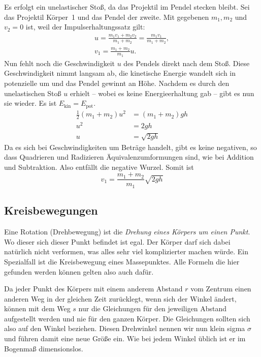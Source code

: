 \documentclass[a4paper,10pt,fleqn,twocolumn,twoside]{article}
\begin{document}
Es erfolgt ein unelastischer Stoß, da das Projektil im Pendel stecken
bleibt. Sei das Projektil Körper~1 und das Pendel der zweite.
Mit gegebenen \(m_1, m_2\) und \(v_2=0\) ist, weil der
Impulserhaltungssatz gilt:
\begin{gather*}
u = \frac{m_1 v_1 + m_2 v_2}{m_1 + m_2} = \frac{m_1 v_1}{m_1 + m_2},\\
v_1 = \frac{m_1 + m_2}{m_1} u.
\end{gather*}
%
Nun fehlt noch die Geschwindigkeit \(u\) des Pendels direkt nach
dem Stoß. Diese Geschwindigkeit nimmt langsam ab, die kinetische
Energie wandelt sich in potenzielle um und das Pendel gewinnt an
Höhe. Nachdem es durch den unelastischen Stoß \(u\) erhielt -- wobei
es keine Energieerhaltung gab -- gibt es nun sie wieder.
Es ist \(E_\text{kin} = E_\text{pot}\).
\begin{align*}
\frac{1}{2}(m_1+m_2) u^2 &= (m_1+m_2)gh\\
u^2 &= 2gh\\
u &= \sqrt{2gh}
\end{align*}
Da es sich bei Geschwindigkeiten um Beträge handelt, gibt es keine
negativen, so dass Quadrieren und Radizieren Äquivalenzumformungen
sind, wie bei Addition und Subtraktion. Also entfällt die negative
Wurzel. Somit ist
\[v_1 = \frac{m_1+m_2}{m_1} \sqrt{2gh}\]

\subsection{Kreisbewegungen}


Eine Rotation (Drehbewegung) ist die \textit{Drehung eines Körpers
um einen Punkt}. Wo dieser sich dieser Punkt befindet ist egal.
Der Körper darf sich dabei natürlich nicht verformen, was alles
sehr viel komplizierter machen würde. Ein Spezialfall ist die
Kreisbewegung eines Massepunktes. Alle Formeln die hier gefunden
werden können gelten also auch dafür.

Da jeder Punkt des Körpers mit einem anderem Abstand \(r\) vom
Zentrum einen anderen Weg in der gleichen Zeit zurücklegt, wenn
sich der Winkel ändert, können mit dem Weg \(s\) nur die Gleichungen
für den jeweiligen Abstand aufgestellt werden und nie für den
ganzen Körper. Die Gleichungen sollten sich also auf den Winkel
beziehen. Diesen Drehwinkel nennen wir nun klein sigma \(\sigma\)
und führen damit eine neue Größe ein. Wie bei jedem Winkel
üblich ist er im Bogenmaß dimensionslos.
\end{document}
